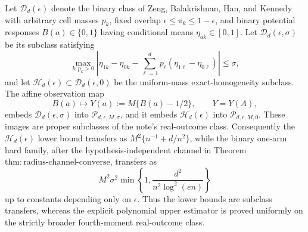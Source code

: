 Let \(\mathcal D_d(\epsilon)\) denote the binary class of Zeng, Balakrishnan, Han, and Kennedy with arbitrary cell masses \(p_k\), fixed overlap \(\epsilon\le\pi_k\le1-\epsilon\), and binary potential responses \(B(a)\in\{0,1\}\) having conditional means \(\eta_{ak}\in[0,1]\).  Let \(\mathcal D_d(\epsilon,\sigma)\) be its subclass satisfying
\[
 \max_{k:p_k>0}\left|\eta_{1k}-\eta_{0k}-\sum_{\ell=1}^dp_{\ell}(\eta_{1\ell}-\eta_{0\ell})\right|\le\sigma,
\]
and let \(\mathcal H_d(\epsilon)\subset\mathcal D_d(\epsilon,0)\) be the uniform-mass exact-homogeneity subclass.  The affine observation map
\[
 B(a)\longmapsto Y(a):=M\{B(a)-1/2\},\qquad Y=Y(A),
\]
embeds \(\mathcal D_d(\epsilon,\sigma)\) into \(\mathcal P_{d,\epsilon,M,\sigma}\), and it embeds \(\mathcal H_d(\epsilon)\) into \(\mathcal P_{d,\epsilon,M,0}\).  These images are proper subclasses of the note's real-outcome class.  Consequently the \(\mathcal H_d(\epsilon)\) lower bound transfers as \(M^2\{n^{-1}+d/n^2\}\), while the binary one-arm hard family, after the hypothesis-independent channel in Theorem~\(\mathrm{thm:radius\text{-}channel\text{-}converse}\), transfers as
\[
 M^2\sigma^2\min\left\{1,\frac{d^2}{n^2\log^2(en)}\right\}
\]
up to constants depending only on \(\epsilon\).  Thus the lower bounds are subclass transfers, whereas the explicit polynomial upper estimator is proved uniformly on the strictly broader fourth-moment real-outcome class.